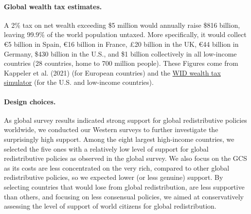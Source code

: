 \begin{small}
\paragraph{\small Global wealth tax estimates.}
A 2\% tax on net wealth exceeding \$5 million would annually raise \$816 billion, leaving 99.9\% of the world population untaxed. More specifically, it would collect \euro{}5 billion in Spain, \euro{}16 billion in France, £20 billion in the UK, \euro{}44 billion in Germany, \$430 billion in the U.S., and \$1 billion collectively in all low-income countries (28 countries, home to 700 million people). These Figures come from Kappeler et al. (2021)\cite{kapeller_european_2021} (for European countries) and the \href{https://wid.world/world-wealth-tax-simulator/}{WID wealth tax simulator} (for the U.S. and low-income countries).\cite{chancel_world_2022}


\paragraph{\small Design choices.}

As global survey results indicated strong support for global redistributive policies worldwide, we conducted our Western surveys to further investigate the surprisingly high support.  %
Among the eight largest high-income countries, we selected the five ones with a relatively low level of support for global redistributive policies as observed in the global survey. We also focus on the GCS as its costs are less concentrated on the very rich, compared to other global redistributive policies, so we expected lower (or less genuine) support. By selecting countries that would lose from global redistribution, are less supportive than others, and focusing on less consensual policies, we aimed at conservatively assessing the level of support of world citizens for global redistribution. 


\end{small}
